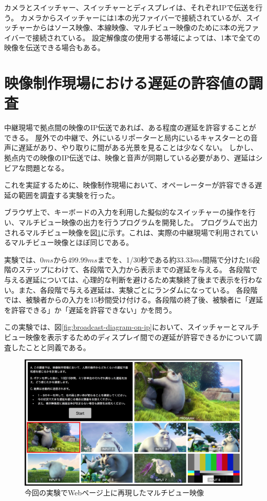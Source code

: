 カメラとスイッチャー、スイッチャーとディスプレイは、それぞれIPで伝送を行う。
カメラからスイッチャーには1本の光ファイバーで接続されているが、スイッチャーからはソース映像、本線映像、マルチビュー映像のために3本の光ファイバーで接続されている。
設定解像度の使用する帯域によっては、1本で全ての映像を伝送できる場合もある。

\section{映像制作現場における遅延の許容値の調査}

中継現場で拠点間の映像のIP伝送であれば、ある程度の遅延を許容することができる。
屋外での中継で、外にいるリポーターと局内にいるキャスターとの音声に遅延があり、やり取りに間がある光景を見ることは少なくない。
しかし、拠点内での映像のIP伝送では、映像と音声が同期している必要があり、遅延はシビアな問題となる。

これを実証するために、映像制作現場において、オペーレーターが許容できる遅延の範囲を調査する実験を行った。

ブラウザ上で、キーボードの入力を利用した擬似的なスイッチャーの操作を行い、マルチビュー映像の出力を行うプログラムを開発した。
プログラムで出力されるマルチビュー映像を図\ref{fig:mv-delay-virtual}に示す。これは、実際の中継現場で利用されているマルチビュー映像とほぼ同じである。

実験では、$0ms$から$499.99ms$までを、1/30秒である約$33.33ms$間隔で分けた16段階のステップにわけて、各段階で入力から表示までの遅延を与える。
各段階で与える遅延については、心理的な判断を避けるため実験終了後まで表示を行わない。また、各段階で与える遅延は、実験ごとにランダムになっている。
各段階では、被験者からの入力を15秒間受け付ける。各段階の終了後、被験者に「遅延を許容できる」か「遅延を許容できない」かを問う。

この実験では、図\ref{fig:broadcast-diagram-on-ip}において、スイッチャーとマルチビュー映像を表示するためのディスプレイ間での遅延が許容できるかについて調査したことと同義である。

\begin{figure}[htbp]
  \begin{center}
    \includegraphics[bb=0 0 1294 750,width=14cm]{img/mv-delay-virtual.png}
  \end{center}
  \caption{今回の実験でWebページ上に再現したマルチビュー映像}
  \label{fig:mv-delay-virtual}
\end{figure}

